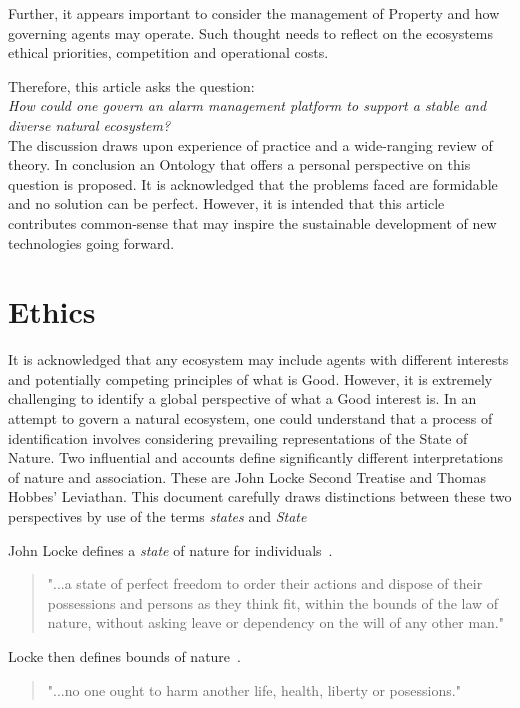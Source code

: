 \documentclass[11pt, oneside]{article}   	%
\begin{document}
Further, it appears important to consider the management of Property and how governing agents may operate.
Such thought needs to reflect on the ecosystems ethical priorities, competition and operational costs.\

Therefore, this article asks the question:\\

\emph{How could one govern an alarm management platform to support a stable and diverse natural ecosystem?}\\

The discussion draws upon experience of practice and a wide-ranging review of theory.
In conclusion an Ontology that offers a personal perspective on this question is proposed.
It is acknowledged that the problems faced are formidable and no solution can be perfect.
However, it is intended that this article contributes common-sense that may inspire the sustainable development of new technologies going forward.\


\section{Ethics}
It is acknowledged that any ecosystem may include agents with different interests and potentially competing principles of what is Good.
However, it is extremely challenging to identify a global perspective of what a Good interest is.
In an attempt to govern a natural ecosystem, one could understand that a process of identification involves considering prevailing representations of the State of Nature.
Two influential and accounts define significantly different interpretations of nature and association.
These are John Locke Second Treatise and Thomas Hobbes' Leviathan.
This document carefully draws distinctions between these two perspectives by use of the terms \emph{states} and \emph{State}\

John Locke defines a \emph{state} of nature for individuals~\cite{jl1}.

\begin{quote}
"...a state of perfect freedom to order their actions and dispose of their possessions and persons as they think fit, within the bounds of the law of nature, without asking leave or dependency on the will of any other man."
\end{quote}

Locke then defines bounds of nature~\cite{jl1}.

\begin{quote}
"...no one ought to harm another life, health, liberty or posessions."
\end{quote}
\end{document}
